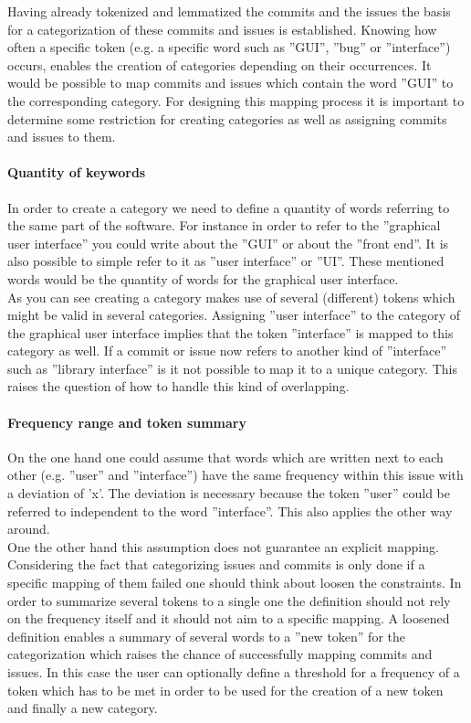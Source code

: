 Having already tokenized and lemmatized the commits and the issues the basis for a categorization of these commits and issues is established.
Knowing how often a specific token (e.g. a specific word such as ''GUI'', ''bug'' or ''interface'') occurs, enables the creation of categories  depending on their occurrences.
It would be possible to map commits and issues which contain the word ''GUI'' to the corresponding category.
For designing this mapping process it is important to determine some restriction for creating categories as well as assigning commits and issues to them. 

\paragraph{Quantity of keywords}

In order to create a category we need to define a quantity of words referring to the same part of the software.
For instance in order to refer to the ''graphical user interface'' you could write about the ''GUI'' or about the ''front end''.
It is also possible to simple refer to it as ''user interface'' or ''UI''.
These mentioned words would be the quantity of words for the graphical user interface. \\
As you can see creating a category makes use of several (different) tokens which might be valid in several categories.
Assigning ''user interface'' to the category of the graphical user interface implies that the token ''interface'' is mapped to this category as well.
If a commit or issue now refers to another kind of ''interface'' such as ''library interface'' is it not possible to map it to a unique category.
This raises the question of how to handle this kind of overlapping. 

\paragraph{Frequency range and token summary}

On the one hand one could assume that words which are written next to each other (e.g. ''user'' and  ''interface'') have the same frequency within this issue with a deviation of 'x'.
The deviation is necessary because the token ''user'' could be referred to independent to the word ''interface''.
This also applies the other way around. \\
One the other hand this assumption does not guarantee an explicit mapping.
Considering the fact that categorizing issues and commits is only done if a specific mapping of them failed one should think about loosen the constraints.
In order to summarize several tokens to a single one the definition should not rely on the frequency itself and it should not aim to a specific mapping.
A loosened definition enables a summary of several words to a ''new token'' for the categorization which raises the chance of successfully mapping commits and issues.
In this case the user can optionally define a threshold for a frequency of a token which has to be met in order to be used for the creation of a new token and finally a new category.


